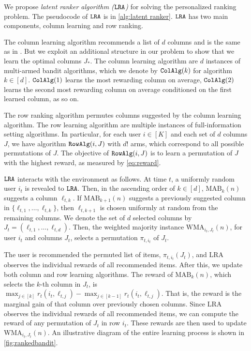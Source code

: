 
\newcommand{\colalg}{{\tt ColAlg}}
\newcommand{\expthree}{{\tt Exp3}}
\newcommand{\latentranker}{{\tt LRA}}
\newcommand{\rowalg}{{\tt RowAlg}}
\newcommand{\ucb}{{\tt UCB1}}

We propose \emph{latent ranker algorithm ($\latentranker$)} for solving the personalized ranking problem. The pseudocode of $\latentranker$ is in \cref{alg:latent ranker}. $\latentranker$ has two main components, column learning and row ranking.

The column learning algorithm recommends a list of $d$ columns and is the same as in \citet{radlinski2008learning}. But we exploit an additional structure in our problem to show that we learn the optimal columns $J_\ast$. The column learning algorithm are $d$ instances of multi-armed bandit algorithms, which we denote by $\colalg(k)$ for algorithm $k \in [d]$. $\colalg(1)$ learns the most rewarding column on average, $\colalg(2)$ learns the second most rewarding column on average conditioned on the first learned column, as so on.

The row ranking algorithm permutes columns suggested by the column learning algorithm. The row learning algorithm are multiple instances of full-information setting algorithms. In particular, for each user $i \in [K]$ and each set of $d$ columns $J$, we have algorithm $\rowalg(i, J)$ with $d!$ arms, which correspond to all possible permutations of $J$. The objective of $\rowalg(i, J)$ is to learn a permutation of $J$ with the highest reward, as measured by \eqref{eq:reward}.

$\latentranker$ interacts with the environment as follows. At time $t$, a uniformly random user $i_t$ is revealed to $\latentranker$. Then, in the ascending order of $k \in [d]$, $\textrm{MAB}_k(n)$ suggests a column $\ell_{t, k}$. If $\textrm{MAB}_{k + 1}(n)$ suggests a previously suggested column in $\{\ell_{t, 1}, \dots, \ell_{t, k}\}$, then $\ell_{t, k + 1}$ is chosen uniformly at random from the remaining columns. We denote the set of $d$ selected columns by $J_t = (\ell_{t, 1}, \dots, \ell_{t, d})$. Then, the weighted majority instance $\textrm{WMA}_{i_t, J_t}(n)$, for user $i_t$ and columns $J_t$, selects a permutation $\pi_{t, i_t}$ of $J_t$.

The user is recommended the permuted list of items, $\pi_{t, i_t}(J_t)$, and LRA observes the individual rewards of all recommended items. After this, we update both column and row learning algorithms. The reward of $\textrm{MAB}_k(n)$, which selects the $k$-th column in $J_t$, is $\max_{j \in [k]} r_t(i_t, \ell_{t, j}) - \max_{j \in [k - 1]} r_t(i_t, \ell_{t, j})$. That is, the reward is the marginal gain of that column over previously chosen columns. Since LRA observes the individual rewards of all recommended items, we can compute the reward of any permutation of $J_t$ in row $i_t$. These rewards are then used to update $\textrm{WMA}_{i_t, J_t}(n)$. An illustrative diagram of the entire learning process is shown in \cref{fig:rankedbandit}.

